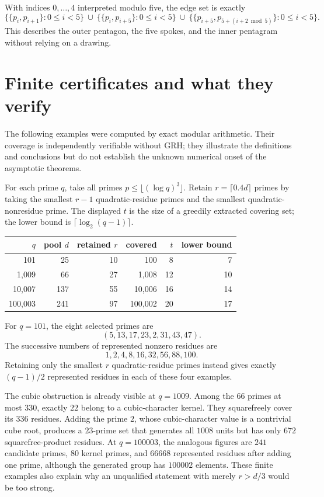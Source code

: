 \documentclass[11pt,a4paper]{article}
\theoremstyle{definition}
\theoremstyle{remark}
\begin{document}
With indices $0,\ldots,4$ interpreted modulo five, the edge set is
exactly
\[
 \{\{p_i,p_{i+1}\}:0\leq i<5\}
 \ \cup\ \{\{p_i,p_{i+5}\}:0\leq i<5\}
 \ \cup\ \{\{p_{i+5},p_{5+(i+2\bmod5)}\}:0\leq i<5\}.
\]
This describes the outer pentagon, the five spokes, and the inner
pentagram without relying on a drawing.




\section{Finite certificates and what they verify}\label{p-sec:certificates}
The following examples were computed by exact modular arithmetic.
Their coverage is independently verifiable without GRH; they illustrate
the definitions and conclusions but do not establish the unknown
numerical onset of the asymptotic theorems.

For each prime $q$, take all primes $p\le\lfloor(\log q)^3\rfloor$.
Retain $r=\lceil0.4d\rceil$ primes by taking the smallest $r-1$
quadratic-residue primes and the smallest quadratic-nonresidue prime.
The displayed $t$ is the size of a greedily extracted covering set;
the lower bound is $\lceil\log_2(q-1)\rceil$.
\begin{center}
\begin{tabular}{rrrrrr}
\toprule
$q$ & pool $d$ & retained $r$ & covered & $t$ & lower bound\\
\midrule
101 & 25 & 10 & 100 & 8 & 7\\
1,009 & 66 & 27 & 1,008 & 12 & 10\\
10,007 & 137 & 55 & 10,006 & 16 & 14\\
100,003 & 241 & 97 & 100,002 & 20 & 17\\
\bottomrule
\end{tabular}
\end{center}
For $q=101$, the eight selected primes are
\[
 (5,13,17,23,2,31,43,47).
\]
The successive numbers of represented nonzero residues are
\[
 1,2,4,8,16,32,56,88,100.
\]
Retaining only the smallest $r$ quadratic-residue primes instead gives
exactly $(q-1)/2$ represented residues in each of these four examples.

The cubic obstruction is already visible at $q=1009$. Among the
$66$ primes at most $330$, exactly $22$ belong to a cubic-character
kernel. They squarefreely cover its $336$ residues. Adding the prime
$2$, whose cubic-character value is a nontrivial cube root, produces
a $23$-prime set that generates all $1008$ units but has only $672$
squarefree-product residues. At $q=100003$, the analogous figures are
$241$ candidate primes, $80$ kernel primes, and $66668$ represented
residues after adding one prime, although the generated group has
$100002$ elements. These finite examples also explain why an
unqualified statement with merely $r>d/3$ would be too strong.
\end{document}
